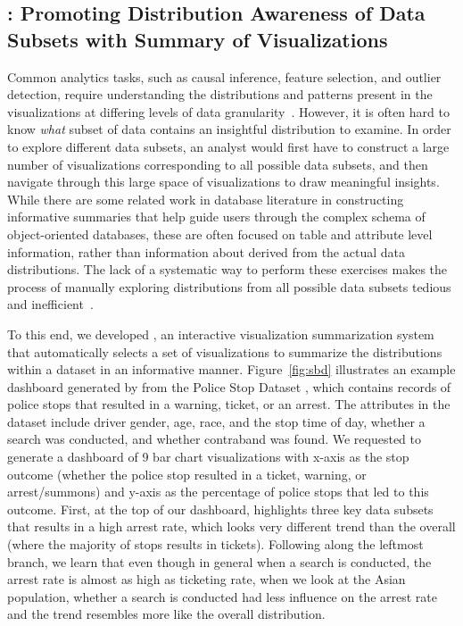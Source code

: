 \subsection{\sbd: Promoting Distribution Awareness of Data Subsets with Summary of Visualizations}
\par Common analytics tasks, such as causal inference, feature selection, and outlier detection, require understanding the distributions and patterns present in the visualizations at differing levels of data granularity~\cite{Anand2015,Heer2012,Wu2013}. However, it is often hard to know \textit{what} subset of data contains an insightful distribution to examine. In order to explore different data subsets, an analyst would first have to construct a large number of visualizations corresponding to all possible data subsets, and then navigate through this large space of visualizations to draw meaningful insights. While there are some related work in database literature in constructing informative summaries that help guide users through the complex schema of object-oriented databases\cite{McHugh1997,Yu2006}, these are often focused on table and attribute level information, rather than information about derived from the actual data distributions. The lack of a systematic way to perform these exercises makes the process of manually exploring distributions from all possible data subsets tedious and inefficient~\cite{Sarawagi1998,Sarawagi2000}.
\par To this end, we developed \sbd, an interactive visualization summarization system that automatically selects a set of visualizations to summarize the distributions within a dataset in an informative manner. Figure~\ref{fig:sbd} illustrates an example dashboard generated by \sbd from the Police Stop Dataset \cite{police}, which contains records of police stops that resulted in a warning, ticket, or an arrest. The attributes in the dataset include driver gender, age, race, and the stop time of day, whether a search was conducted, and whether contraband was found. We requested \sbd to generate a dashboard of 9 bar chart visualizations with x-axis as the stop outcome (whether the police stop resulted in a ticket, warning, or arrest/summons) and y-axis as the percentage of police stops that led to this outcome. First, at the top of our dashboard, \sbd highlights three key data subsets that results in a high arrest rate, which looks very different trend than the overall (where the majority of stops results in tickets). Following along the leftmost branch, we learn that even though in general when a search is conducted, the arrest rate is almost as high as ticketing rate, when we look at the Asian population, whether a search is conducted had less influence on the arrest rate and the trend resembles more like the overall distribution.
